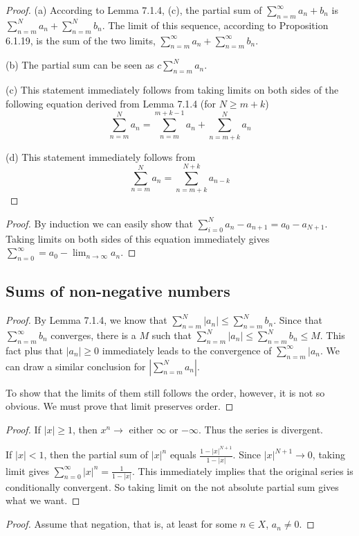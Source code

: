\begin{proof}
(a)
According to Lemma 7.1.4, (c), the partial sum of $\sum_{n=m}^\infty{a_n+b_n}$ is $\sum_{n=m}^Na_n + \sum_{n=m}^Nb_n$. The limit of this sequence, according to Proposition 6.1.19, is the sum of the two limits, $\sum_{n=m}^\infty a_n+ \sum_{n=m}^\infty b_n$.

(b)
The partial sum can be seen as $c \sum_{n=m}^Na_n$.

(c)
This statement immediately follows from taking limits on both sides of the following equation derived from Lemma 7.1.4 (for $N \geq m+k$)
\[
\sum_{n=m}^Na_n = \sum_{n=m}^{m+k-1}a_n + \sum_{n=m+k}^Na_n
\]

(d)
This statement immediately follows from 
\[
\sum_{n=m}^Na_n = \sum_{n=m+k}^{N+k}a_{n-k}
\]
\end{proof}

\begin{proof}
By induction we can easily show that $\sum_{i=0}^N{a_n-a_{n+1}} = a_0-a_{N+1}$. Taking limits on both sides of this equation immediately gives 
$\sum_{n=0}^\infty = a_0-\lim_{n \to \infty}a_n$.
\end{proof}

\subsection{Sums of non-negative numbers}
\begin{proof}
By Lemma 7.1.4, we know that $\sum_{n=m}^N|a_n| \leq \sum_{n=m}^Nb_n$. Since that $\sum_{n=m}^\infty b_n$ converges, there is a $M$ such that 
$\sum_{n=m}^N|a_n| \leq \sum_{n=m}^Nb_n \leq M$. This fact plus that $|a_n| \geq 0$ immediately leads to the convergence of $\sum_{n=m}^\infty|a_n$. We can draw a similar conclusion for $|\sum_{n=m}^Na_{n}|$.

To show that the limits of them still follows the order, however, it is not so obvious. We must prove that limit preserves order.
\end{proof}

\begin{proof}
If $|x| \geq 1$, then $x^n \to$ either $\infty$ or $-\infty$. Thus the series is divergent.

If $|x| < 1$, then the partial sum of $|x|^n$ equals $\frac{1-|x|^{N+1}}{1-|x|}$. Since $|x|^{N+1} \to 0$, taking limit gives $\sum_{n=0}^\infty {|x|^n} = \frac{1}{1-|x|}$. This immediately implies that the original series is conditionally convergent. So taking limit on the not absolute partial sum gives what we want.
\end{proof}

\begin{proof}
Assume that negation, that is, at least for some $n \in X$, $a_n \neq 0$.
\end{proof}